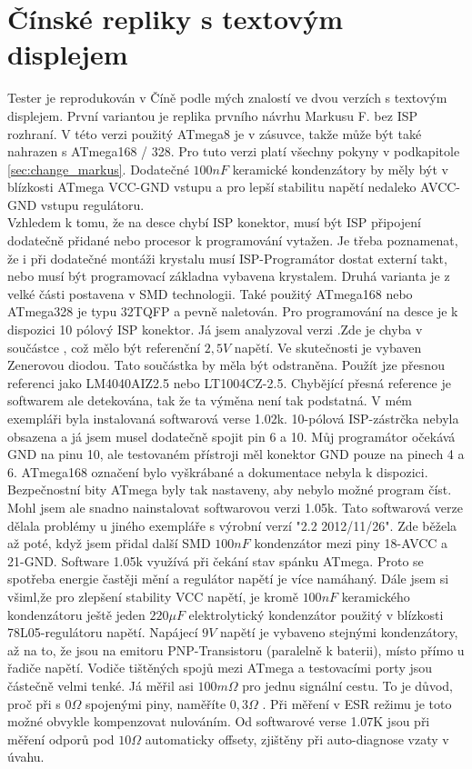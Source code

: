 \section{Čínské repliky s textovým displejem}
Tester je reprodukován v Číně podle mých znalostí ve dvou verzích s textovým displejem.
První variantou je replika prvního návrhu Markusu F. bez ISP rozhraní.
V této verzi použitý ATmega8 je  v zásuvce, takže může být také nahrazen s ATmega168 / 328.
Pro tuto verzi platí všechny pokyny v podkapitole \ref{sec:change_markus}.
Dodatečné \(100nF\) keramické kondenzátory by měly být v blízkosti ATmega VCC-GND vstupu a
pro lepší stabilitu napětí nedaleko AVCC-GND vstupu regulátoru.\\
Vzhledem k tomu, že na desce chybí ISP konektor, musí být ISP připojení dodatečně přidané nebo
procesor k programování vytažen.
Je třeba poznamenat, že i při dodatečné montáži krystalu musí ISP-Programátor dostat externí takt,
nebo musí být programovací základna vybavena krystalem.
Druhá varianta je z velké části postavena v SMD technologii. Také použitý ATmega168 nebo ATmega328
je typu 32TQFP a pevně naletován.
Pro programování na desce je k dispozici 10 pólový ISP konektor.
Já  jsem analyzoval verzi  .Zde je chyba v součástce ,
což mělo být referenční \(2,5V\) napětí. Ve skutečnosti je vybaven Zenerovou diodou.
Tato součástka by měla být odstraněna. Použít jze přesnou referenci jako LM4040AIZ2.5 nebo
LT1004CZ-2.5. Chybějící přesná reference je softwarem ale detekována, tak že ta výměna
není tak podstatná.
V mém exempláři byla instalovaná softwarová verse 1.02k. 10-pólová ISP-zástrčka nebyla obsazena
a já jsem  musel dodatečně spojit pin 6 a 10. Můj programátor očekává GND na pinu 10, ale
testovaném přístroji měl konektor GND pouze na pinech 4 a 6.
ATmega168 označení bylo vyškrábané a dokumentace nebyla k dispozici.
Bezpečnostní bity ATmega byly tak nastaveny, aby nebylo možné program číst.
Mohl jsem ale snadno nainstalovat softwarovou verzi 1.05k.
Tato softwarová verze dělala problémy u jiného exempláře s výrobní verzí "2.2 2012/11/26".
Zde běžela až poté, když jsem přidal další SMD \(100nF\) kondenzátor mezi piny 18-AVCC
a 21-GND. Software 1.05k využívá při čekání stav spánku ATmega.
Proto se spotřeba energie častěji mění a regulátor napětí je více namáhaný.
Dále jsem si všiml,že pro zlepšení stability VCC napětí, je kromě \(100nF\) keramického kondenzátoru
ještě jeden \(220\mu F\) elektrolytický kondenzátor použitý v blízkosti 78L05-regulátoru napětí.
Napájecí \(9V\) napětí je vybaveno stejnými kondenzátory, až na to, že jsou na emitoru PNP-Transistoru
(paralelně k baterii), místo přímo u řadiče napětí.
Vodiče tištěných spojů mezi ATmega a testovacími porty jsou částečně velmi tenké. Já měřil asi \(100m\Omega\)
pro jednu signální cestu. To je důvod, proč při s \(0\Omega\) spojenými piny, naměříte \(0,3\Omega\) .
Při měření v ESR režimu je toto možné obvykle kompenzovat nulováním.
Od softwarové verse 1.07K jsou při měření odporů pod \(10\Omega\) automaticky offsety, zjištěny při
auto-diagnose vzaty v úvahu.

